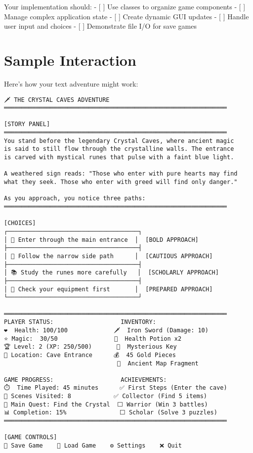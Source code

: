 \documentclass[
  letterpaper,
  DIV=11,
  numbers=noendperiod,
  oneside]{scrreprt}
\begin{document}
Your implementation should: - {[} {]} Use classes to organize game
components - {[} {]} Manage complex application state - {[} {]} Create
dynamic GUI updates - {[} {]} Handle user input and choices - {[} {]}
Demonstrate file I/O for save games

\section{Sample Interaction}\label{sample-interaction-10}

Here's how your text adventure might work:

\begin{verbatim}
🗡️ THE CRYSTAL CAVES ADVENTURE
═══════════════════════════════════════════════════════════════

[STORY PANEL]
═══════════════════════════════════════════════════════════════
You stand before the legendary Crystal Caves, where ancient magic 
is said to still flow through the crystalline walls. The entrance 
is carved with mystical runes that pulse with a faint blue light.

A weathered sign reads: "Those who enter with pure hearts may find 
what they seek. Those who enter with greed will find only danger."

As you approach, you notice three paths:
═══════════════════════════════════════════════════════════════

[CHOICES]
┌─────────────────────────────────────┐
│ 🚪 Enter through the main entrance  │  [BOLD APPROACH]
├─────────────────────────────────────┤
│ 🌿 Follow the narrow side path      │  [CAUTIOUS APPROACH]  
├─────────────────────────────────────┤
│ 📚 Study the runes more carefully   │  [SCHOLARLY APPROACH]
├─────────────────────────────────────┤
│ 🎒 Check your equipment first       │  [PREPARED APPROACH]
└─────────────────────────────────────┘

═══════════════════════════════════════════════════════════════
PLAYER STATUS:                   INVENTORY:
❤️  Health: 100/100             🗡️  Iron Sword (Damage: 10)
⭐ Magic:  30/50                🧪  Health Potion x2
🏆 Level: 2 (XP: 250/500)       🔑  Mysterious Key
🧭 Location: Cave Entrance      💰  45 Gold Pieces
                                📜  Ancient Map Fragment

GAME PROGRESS:                   ACHIEVEMENTS:
⏱️  Time Played: 45 minutes      ✅ First Steps (Enter the cave)
📍 Scenes Visited: 8            ✅ Collector (Find 5 items)
🎯 Main Quest: Find the Crystal  ⬜ Warrior (Win 3 battles)
📊 Completion: 15%               ⬜ Scholar (Solve 3 puzzles)
═══════════════════════════════════════════════════════════════

[GAME CONTROLS]
💾 Save Game    📁 Load Game    ⚙️ Settings    ❌ Quit
\end{verbatim}
\end{document}
